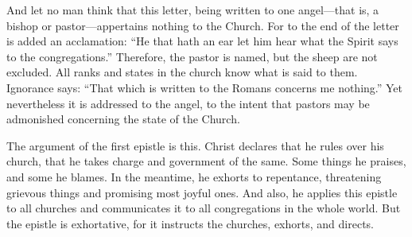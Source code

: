 And let no man think that this letter, being written to one angel—that is, a bishop or pastor—appertains nothing to the Church. For to the end of the letter is added an acclamation: “He that hath an ear let him hear what the Spirit says to the congregations.” Therefore, the pastor is named, but the sheep are not excluded. All ranks and states in the church know what is said to them. Ignorance says: “That which is written to the Romans concerns me nothing.” Yet nevertheless it is addressed to the angel, to the intent that pastors may be admonished concerning the state of the Church.

The argument of the first epistle is this. Christ declares that he rules over his church, that he takes charge and government of the same. Some things he praises, and some he blames. In the meantime, he exhorts to repentance, threatening grievous things and promising most joyful ones. And also, he applies this epistle to all churches and communicates it to all congregations in the whole world. But the epistle is exhortative, for it instructs the churches, exhorts, and directs.

